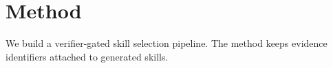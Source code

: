 \section{Method}
We build a verifier-gated skill selection pipeline. The method keeps evidence identifiers attached to generated skills.
